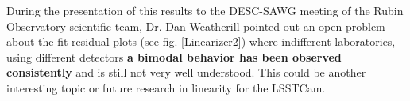 \noindent During the presentation of this results to the DESC-SAWG meeting of the Rubin Observatory scientific team, Dr. Dan Weatherill pointed out an open problem about the fit residual plots (see fig. \ref{Linearizer2}) where indifferent laboratories, using different detectors \textbf{a bimodal behavior has been observed consistently} and is still not very well understood. This could be another interesting topic or future research in linearity for the LSSTCam.\\